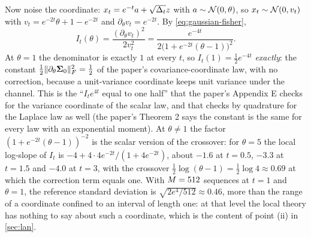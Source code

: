 Now noise the coordinate: $x_t=e^{-t}a+\sqrt{\Delta_t}z$ with $a\sim\mathcal{N}\!\left(0,\theta\right)$, so
$x_t\sim\mathcal{N}\!\left(0,v_t\right)$ with $v_t=e^{-2t}\theta+1-e^{-2t}$ and $\partial_\theta v_t=e^{-2t}$.
By \cref{eq:gaussian-fisher},
\[
  I_t(\theta)=\frac{(\partial_\theta v_t)^2}{2v_t^2}=\frac{e^{-4t}}{2\bigl(1+e^{-2t}(\theta-1)\bigr)^2}.
\]
At $\theta=1$ the denominator is exactly $1$ at every $t$, so $I_t(1)=\tfrac12e^{-4t}$
\emph{exactly}: the constant $\tfrac12\lVert \partial_\theta\mathbf{\Sigma}_0 \rVert_{F}^2=\tfrac12$ of the
paper's covariance-coordinate law, with no correction, because a unit-variance
coordinate keeps unit variance under the channel. This is the ``$I_te^{4t}$ equal to
one half'' that the paper's Appendix E checks for the variance coordinate of the scalar
law, and that  checks by quadrature for the
Laplace law as well (the paper's Theorem 2 says the constant is the same for every
law with an exponential moment). At $\theta\ne1$ the factor $(1+e^{-2t}(\theta-1))^{-2}$ is
the scalar version of the crossover: for $\theta=5$ the local log-slope of $I_t$ is
$-4+4\cdot4e^{-2t}/(1+4e^{-2t})$, about $-1.6$ at $t=0.5$, $-3.3$ at $t=1.5$ and $-4.0$ at
$t=3$, with the crossover $\tfrac12\log(\theta-1)=\tfrac12\log4\approx0.69$ at which the
correction term equals one. With $M=512$ sequences at $t=1$ and $\theta=1$, the
reference standard deviation is $\sqrt{2e^{4}/512}\approx0.46$, more than the range of
a coordinate confined to an interval of length one: at that level the local theory
has nothing to say about such a coordinate, which is the content of point (ii) in
\cref{sec:lan}.


